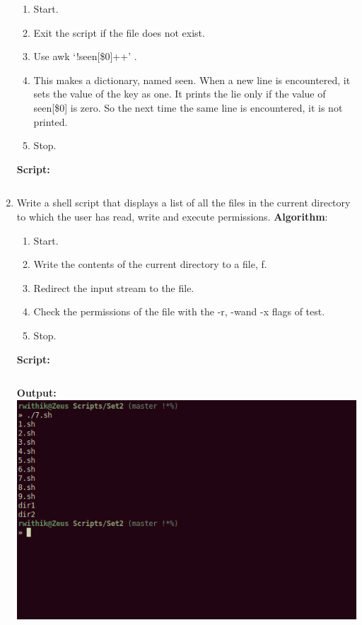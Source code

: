 \documentclass[10pt,a4paper,titlepage]{report}
\begin{document}
\begin{enumerate}
\begin{enumerate}
	\item Start.
	\item Exit the script if the file does not exist.
	\item Use {\color{red}awk `!seen[\$0]++' }.
	\item This makes a dictionary, named seen. When a new line is encountered, it sets the value of the key as one. It prints the lie only if the value of seen[\$0] is zero. So the next time the same line is encountered, it is not printed.
	\item Stop.
\end{enumerate}
\newline
\textbf{Script:}\newline
\inputminted{bash}{../Scripts/Set2/6.sh}
\pagebreak
\item Write a shell script that displays a list of all the files in the current directory to which the user has read, write and execute permissions. \newline
\textbf{Algorithm}:\newline
\begin{enumerate}
	\item Start.
	\item Write the contents of the current directory to a file, f.
	\item Redirect the input stream to the file.
	\item Check the permissions of the file with the {\color{red}-r}, {\color{red}-w}and {\color{red}-x} flags of {\color{red}test}.
	\item Stop.
\end{enumerate}
\newline
\textbf{Script:}\newline
\inputminted{bash}{../Scripts/Set2/7.sh}
\newline
\textbf{Output:}\newline
\includegraphics[width=\linewidth]{../Images/Shell2/7.png}
\pagebreak


\end{enumerate}
\end{document}
